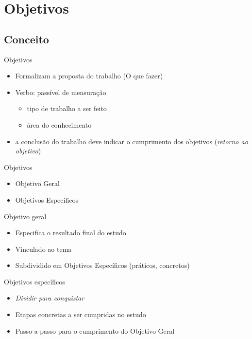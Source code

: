 \documentclass{beamer}
\begin{document}
\section{Objetivos}

\subsection{Conceito}

\begin{frame}{Objetivos}
  \begin{itemize}
  \item Formalizam a proposta do trabalho (\alert{O que} fazer)
  \item \alert{Verbo}: passível de mensuração
    \begin{itemize}
    \item tipo de trabalho a ser feito
    \item área do conhecimento
    \end{itemize}
    \item a conclusão do trabalho deve indicar o cumprimento dos
      objetivos ({\em retorno ao objetivo})
  \end{itemize}
\end{frame}

\begin{frame}{Objetivos}
  \begin{itemize}
  \item Objetivo Geral
  \item Objetivos Específicos
  \end{itemize}
\end{frame}

\begin{frame}{Objetivo geral}
  \begin{itemize}
  \item Especifica o resultado final do estudo
  \item Vinculado ao tema
  \item Subdividido em Objetivos Específicos (práticos, concretos)
  \end{itemize}
\end{frame}

\begin{frame}{Objetivos específicos}
  \begin{itemize}
  \item {\em Dividir para conquistar}
  \item Etapas concretas a ser cumpridas no estudo
  \item Passo-a-passo para o cumprimento do Objetivo Geral
  \end{itemize}
\end{frame}
\end{document}

